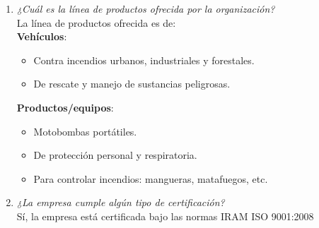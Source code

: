 \documentclass[a4paper,10pt]{article}
\begin{document}
\begin{enumerate}
				\item \textit{¿Cuál es la línea de productos ofrecida por la organización?}\\	
				La línea de productos ofrecida es de:\\
				\textbf{Vehículos}:
				\begin{itemize}
					\item Contra incendios urbanos, industriales y forestales.
					\item De rescate y manejo de sustancias peligrosas.
				\end{itemize}
				\textbf{Productos/equipos}:
				\begin{itemize}
					\item Motobombas portátiles.
					\item De protección personal y respiratoria.
					\item Para controlar incendios: mangueras, matafuegos, etc.
				\end{itemize}	
												
				\item \textit{¿La empresa cumple algún tipo de certificación?}\\
				Sí, la empresa está certificada bajo las normas IRAM ISO 9001:2008
						
			\end{enumerate}
			
			
\end{document}
